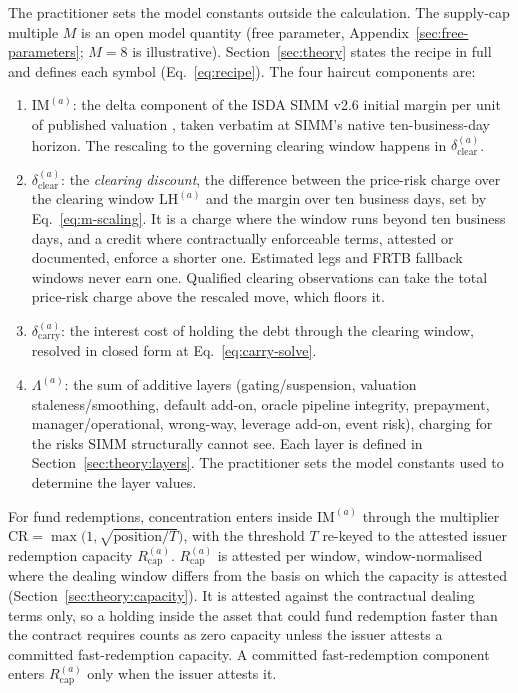The practitioner sets the model constants outside the calculation. The supply-cap multiple $M$ is an open model quantity (free parameter, Appendix~\ref{sec:free-parameters}; $M=8$ is illustrative). Section~\ref{sec:theory} states the recipe in full and defines each symbol (Eq.~\eqref{eq:recipe}). The four haircut components are:
\begin{enumerate}[label=(\roman*)]
\item $\mathrm{IM}^{(a)}$: the delta component of the ISDA SIMM v2.6 initial margin per unit of published valuation \cite{isda_simm_v2_6}, taken verbatim at SIMM's native ten-business-day horizon. The rescaling to the governing clearing window happens in $\delta_{\mathrm{clear}}^{(a)}$.
\item $\delta_{\mathrm{clear}}^{(a)}$: the \emph{clearing discount}, the difference between the price-risk charge over the clearing window $\mathrm{LH}^{(a)}$ and the margin over ten business days, set by Eq.~\eqref{eq:m-scaling}. It is a charge where the window runs beyond ten business days, and a credit where contractually enforceable terms, attested or documented, enforce a shorter one. Estimated legs and FRTB fallback windows never earn one. Qualified clearing observations can take the total price-risk charge above the rescaled move, which floors it.
\item $\delta_{\mathrm{carry}}^{(a)}$: the interest cost of holding the debt through the clearing window, resolved in closed form at Eq.~\eqref{eq:carry-solve}.
\item $\Lambda^{(a)}$: the sum of additive layers (gating/suspension, valuation staleness/smoothing, default add-on, oracle pipeline integrity, prepayment, manager/operational, wrong-way, leverage add-on, event risk), charging for the risks SIMM structurally cannot see. Each layer is defined in Section~\ref{sec:theory:layers}. The practitioner sets the model constants used to determine the layer values.
\end{enumerate}

For fund redemptions, concentration enters inside $\mathrm{IM}^{(a)}$ through the multiplier $\mathrm{CR}=\max\bigl(1,\sqrt{\mathrm{position}/T}\bigr)$, with the threshold $T$ re-keyed to the attested issuer redemption capacity $R_{\mathrm{cap}}^{(a)}$. $R_{\mathrm{cap}}^{(a)}$ is attested per window, window-normalised where the dealing window differs from the basis on which the capacity is attested (Section~\ref{sec:theory:capacity}). It is attested against the contractual dealing terms only, so a holding inside the asset that could fund redemption faster than the contract requires counts as zero capacity unless the issuer attests a committed fast-redemption capacity. A committed fast-redemption component enters $R_{\mathrm{cap}}^{(a)}$ only when the issuer attests it.

